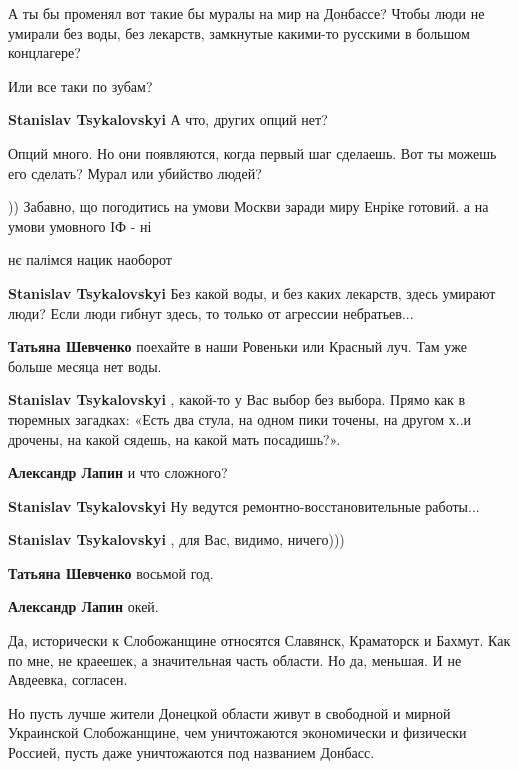 \begin{itemize}

А ты бы променял вот такие бы муралы на мир на Донбассе? Чтобы люди не умирали
без воды, без лекарств, замкнутые какими-то русскими в большом концлагере?

Или все таки по зубам?

\begin{itemize} %
\textbf{Stanislav Tsykalovskyi} А что, других опций нет?

Опций много.
Но они появляются, когда первый шаг сделаешь.
Вот ты можешь его сделать?
Мурал или убийство людей?

)) Забавно, що погодитись на умови Москви заради миру Енріке готовий. а на умови умовного ІФ - ні

нє палімся
нацик наоборот

\textbf{Stanislav Tsykalovskyi} Без какой воды, и без каких лекарств, здесь умирают люди? Если люди гибнут здесь, то только от агрессии небратьев...

\textbf{Татьяна Шевченко} поехайте в наши Ровеньки или Красный луч. Там уже больше месяца нет воды.

\textbf{Stanislav Tsykalovskyi} , какой-то у Вас выбор без выбора. Прямо как в тюремных загадках: «Есть два стула, на одном пики точены, на другом х..и дрочены, на какой сядешь, на какой мать посадишь?».

\textbf{Александр Лапин} и что сложного?

\textbf{Stanislav Tsykalovskyi} Ну ведутся ремонтно-восстановительные работы...

\textbf{Stanislav Tsykalovskyi} , для Вас, видимо, ничего)))

\textbf{Татьяна Шевченко} восьмой год.

\textbf{Александр Лапин} окей.
\end{itemize} %


Да, исторически к Слобожанщине относятся Славянск, Краматорск и Бахмут. Как по
мне, не краеешек, а значительная часть области. Но да, меньшая. И не Авдеевка,
согласен.

Но пусть лучше жители Донецкой области живут в свободной и мирной Украинской
Слобожанщине, чем уничтожаются экономически и физически Россией, пусть даже
уничтожаются под названием Донбасс.


\end{itemize}
